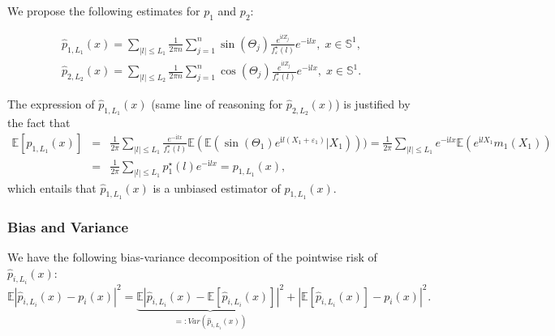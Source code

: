 \documentclass[11pt,a4paper,openany]{article}
\def\E{\mathbb{E}}
\def\S{\mathbb{S}}
\def \compi{\mathrm{i}}
\begin{document}
We propose the following estimates for $p_1$ and $p_2$:

\begin{eqnarray*}
\widehat p_{1,L_1}(x)= \sum_{| l| \leq L_1 }\frac {1}{ 2 \pi n} \sum_{j=1}^n \sin(\Theta_j) \frac{e^{\compi l Z_j}}{f^\star_{\varepsilon}(l)} e^{-\compi l x}, \; x \in \S^1, \\
\widehat p_{2,L_2}(x)= \sum_{| l| \leq L _2}\frac {1}{ 2 \pi n} \sum_{j=1}^n \cos(\Theta_j) \frac{e^{\compi l Z_j}}{f^\star_{\varepsilon}(l)} e^{-\compi l x}, \;x \in \S^1.
\end{eqnarray*}

The expression of $\hat p_{1,L_1}(x)$ (same line of reasoning for $\hat p_{2,L_2}(x)$) is justified by the fact that 
\begin{eqnarray*}
\E  \left [\widehat p_{1,L_1}(x) \right ] &=&  \frac{1}{2\pi}\sum_{| l| \leq L_1 }\frac{e^{-\compi l x}}{f^\star_{\varepsilon}(l)} \E (\E(\sin(\Theta_1)e^{\compi l(X_1+\varepsilon_1)} |X_1))) 
=  \frac{1}{2\pi}\sum_{| l| \leq L_1 }e^{-\mathrm{i} l x} \E(e^{\compi l X_1}m_1(X_1)) \\
&=&  \frac{1}{2\pi}\sum_{| l| \leq L_1 } p_1^\star(l) e^{-\compi l x} = p_{1,L_1}(x),
\end{eqnarray*}
which entails that $\widehat p_{1,L_1}(x)$ is a unbiased estimator of $p_{1,L_1}(x)$.


\subsubsection{Bias and Variance}


We have the following bias-variance decomposition of the pointwise risk of $\hat p_{i,L_i}(x)$: 
$$
\E |\widehat p_{i,L_i}(x) - p_i(x)|^2 =  \underbrace{\E | \widehat p_{i,L_i}(x) -  \E[\widehat p_{i,L_i}(x)] |^2}_{=:Var(\hat p_{i,L_i}(x))} + {| \E[\widehat p_{i,L_i}(x)] -p_i(x)|^2}_{}.
$$
\end{document}
